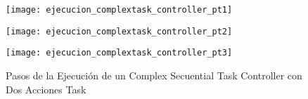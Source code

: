 \begin{figure}[H]
	\centering
	\texttt{[image: ejecucion\_complextask\_controller\_pt1]}
\end{figure}

\begin{figure}[H]
	\centering
	\texttt{[image: ejecucion\_complextask\_controller\_pt2]}
\end{figure}

\begin{figure}[H]
	\centering
	\texttt{[image: ejecucion\_complextask\_controller\_pt3]}
	\caption{Pasos de la Ejecución de un Complex Secuential Task Controller con
	Dos Acciones Task}
	\label{fig:ejecucion_complextask_controller}
\end{figure}